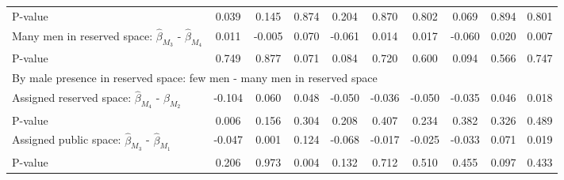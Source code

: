 \begin{tabular}{l*{9}{c}}
\quad P-value       &       0.039         &       0.145         &       0.874         &       0.204         &       0.870         &       0.802         &       0.069         &       0.894         &       0.801         \\
\quad Many men in reserved space: $\hat\beta_{M_3}$ - $\hat\beta_{M_4}$&       0.011         &      -0.005         &       0.070         &      -0.061         &       0.014         &       0.017         &      -0.060         &       0.020         &       0.007         \\
\quad P-value       &       0.749         &       0.877         &       0.071         &       0.084         &       0.720         &       0.600         &       0.094         &       0.566         &       0.747         \\
\multicolumn{10}{l}{By male presence in reserved space: few men - many men in reserved space} \\ \quad Assigned reserved space: $\hat\beta_{M_4}$ - $\hat\beta_{M_2}$&      -0.104         &       0.060         &       0.048         &      -0.050         &      -0.036         &      -0.050         &      -0.035         &       0.046         &       0.018         \\
\quad P-value       &       0.006         &       0.156         &       0.304         &       0.208         &       0.407         &       0.234         &       0.382         &       0.326         &       0.489         \\
\quad Assigned public space: $\hat\beta_{M_3}$ - $\hat\beta_{M_1}$&      -0.047         &       0.001         &       0.124         &      -0.068         &      -0.017         &      -0.025         &      -0.033         &       0.071         &       0.019         \\
\quad P-value       &       0.206         &       0.973         &       0.004         &       0.132         &       0.712         &       0.510         &       0.455         &       0.097         &       0.433         \\
\hline\hline \end{tabular}
